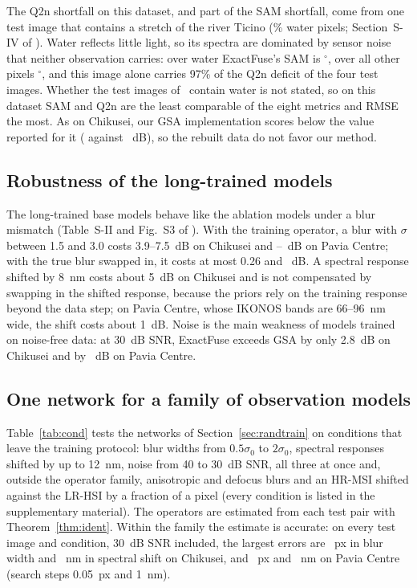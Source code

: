 \documentclass[journal]{IEEEtran}
\begin{document}
The Q2n shortfall on this dataset, and part of the SAM shortfall, come from one test image that contains a stretch of the river Ticino (\% water pixels; Section~S-IV of \supp). Water reflects little light, so its spectra are dominated by sensor noise that neither observation carries: over water ExactFuse's SAM is $^\circ$, over all other pixels $^\circ$, and this image alone carries 97\% of the Q2n deficit of the four test images. Whether the test images of~\cite{chen2026twostage} contain water is not stated, so on this dataset SAM and Q2n are the least comparable of the eight metrics and RMSE the most. As on Chikusei, our GSA implementation scores below the value reported for it ( against ~dB), so the rebuilt data do not favor our method.

\subsection{Robustness of the long-trained models}
\label{sec:robust}
The long-trained base models behave like the ablation models under a blur mismatch (Table~S-II and Fig.~S3 of \supp). With the training operator, a blur with $\sigma$ between 1.5 and 3.0 costs 3.9--7.5~dB on Chikusei and --~dB on Pavia Centre; with the true blur swapped in, it costs at most 0.26 and ~dB. A spectral response shifted by 8~nm costs about 5~dB on Chikusei and is not compensated by swapping in the shifted response, because the priors rely on the training response beyond the data step; on Pavia Centre, whose IKONOS bands are 66--96~nm wide, the shift costs about 1~dB. Noise is the main weakness of models trained on noise-free data: at 30~dB SNR, ExactFuse exceeds GSA by only 2.8~dB on Chikusei and by ~dB on Pavia Centre.

\subsection{One network for a family of observation models}
\label{sec:cond}
\label{sec:blind}
Table~\ref{tab:cond} tests the networks of Section~\ref{sec:randtrain} on conditions that leave the training protocol: blur widths from $0.5\sigma_0$ to $2\sigma_0$, spectral responses shifted by up to 12~nm, noise from 40 to 30~dB SNR, all three at once and, outside the operator family, anisotropic and defocus blurs and an HR-MSI shifted against the LR-HSI by a fraction of a pixel (every condition is listed in the supplementary material). The operators are estimated from each test pair with Theorem~\ref{thm:ident}. Within the family the estimate is accurate: on every test image and condition, 30~dB SNR included, the largest errors are ~px in blur width and ~nm in spectral shift on Chikusei, and ~px and ~nm on Pavia Centre (search steps 0.05~px and 1~nm).
\end{document}
